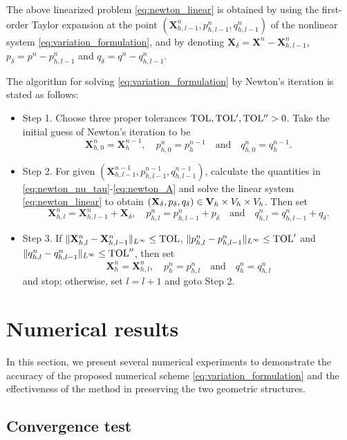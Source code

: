 \documentclass[review]{elsarticle}
\begin{document}
The above linearized problem \eqref{eq:newton_linear} is obtained by using the first-order Taylor expansion at the point $(\mathbf{X}_{h,l-1}^n, p_{h,l-1}^n, q_{h,l-1}^n)$ of the nonlinear system \eqref{eq:variation_formulation}, and by denoting $\mathbf{X}_{\delta} = \mathbf{X}^n - \mathbf{X}_{h,l-1}^n$, $p_\delta = p^n - p_{h,l-1}^n$ and $q_\delta = q^n - q_{h,l-1}^n$.

The algorithm for solving \eqref{eq:variation_formulation} by Newton's iteration is stated as follows:
\begin{itemize}
\item Step 1. Choose three proper tolerances ${\rm TOL}, {\rm TOL'}, {\rm TOL''}>0$. Take the initial guess of Newton's iteration to be
$$
\mathbf{X}_{h,0}^n = \mathbf{X}_h^{n-1},\quad
p_{h,0}^n = p_h^{n-1}
\quad\mbox{and}\quad
q_{h,0}^n = q_h^{n-1} .
$$

\item Step 2.
For given $(\mathbf{X}_{h,l-1}^{n-1},p_{h,l-1}^{n-1},q_{h,l-1}^{n-1})$, calculate the quantities in \eqref{eq:newton_nu_tau}-\eqref{eq:newton_A} and solve the linear system \eqref{eq:newton_linear} to obtain $(\mathbf{X}_\delta, p_{\delta}, q_{\delta})\in {\bf V}_h\times V_h\times V_h$. Then set
$$
\mathbf{X}_{h,l}^n = \mathbf{X}_{h,l-1}^n + \mathbf{X}_\delta,
\quad
p_{h,l}^n = p_{h,l-1}^n + p_\delta
\quad\mbox{and}\quad
q_{h,l}^n = q_{h,l-1}^n + q_\delta .
$$

\item Step 3. If $\|\mathbf{X}_{h,l}^n - \mathbf{X}_{h,l-1}^n\|_{L^\infty}\le {\rm TOL}$, $\|p_{h,l}^n - p_{h,l-1}^n\|_{L^\infty} \le {\rm TOL}'$ and $\|q_{h,l}^n - q_{h,l-1}^n\|_{L^\infty} \le {\rm TOL}''$, then set
$$
\mathbf{X}_h^n = \mathbf{X}_{h,l}^n,
\quad
p_h^n = p_{h,l}^n
\quad\mbox{and}\quad
q_h^n = q_{h,l}^n
$$
and stop; otherwise, set $l = l + 1$ and goto Step 2.

\end{itemize}



\section{Numerical results}

In this section, we present several numerical experiments to demonstrate the accuracy of the proposed numerical scheme \eqref{eq:variation_formulation} and the effectiveness of the method in preserving the two geometric structures.

\subsection{Convergence test}
\end{document}
